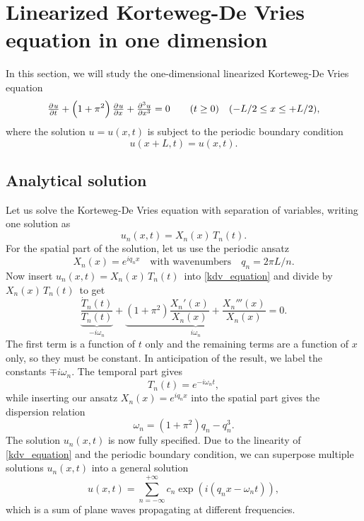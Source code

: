 \section{Linearized Korteweg-De Vries equation in one dimension}

In this section, we will study the one-dimensional linearized Korteweg-De Vries equation
\begin{equation}
\pd{u}{t} + \left(1+\pi^2\right)\pd{u}{x} + \pd[3]{u}{x} = 0 \qquad (t \geq 0) \quad (-L/2 \leq x \leq +L/2),
\label{kdv_equation}
\end{equation}
where the solution $u = u(x,t)$ is subject to the periodic boundary condition
\begin{equation*}
u(x+L, t) = u(x, t).
\end{equation*}

\subsection{Analytical solution}

Let us solve the Korteweg-De Vries equation with separation of variables, writing one solution as
\begin{equation*}
	u_n(x,t) = X_n(x) \, T_n(t).
\end{equation*}
For the spatial part of the solution, let us use the periodic ansatz
\begin{equation*}
	X_n(x) = e^{i q_n x} \quad \text{with wavenumbers} \quad q_n = 2 \pi L / n.
\end{equation*}
Now insert $u_n(x,t) = X_n(x) \, T_n(t)$ into \cref{kdv_equation} and divide by $X_n(x) \, T_n(t)$ to get
\begin{equation*}
	\underbrace{\frac{\dot{T}_n(t)}{T_n(t)}}_{-i \omega_n} + \underbrace{\left( 1 + \pi^2 \right) \frac{X_n'(x)}{X_n(x)} + \frac{X_n'''(x)}{X_n(x)}}_{i \omega_n} = 0.
\end{equation*}
The first term is a function of $t$ only and the remaining terms are a function of $x$ only, so they must be constant.
In anticipation of the result, we label the constants $\mp i \omega_n$.
The temporal part gives
\begin{equation*}
	T_n(t) = e^{-i \omega_n t},
\end{equation*}
while inserting our ansatz $X_n(x) = e^{i q_n x}$ into the spatial part gives the dispersion relation
\begin{equation*}
	\omega_n = (1 + \pi^2) q_n - q_n^3.
\end{equation*}
The solution $u_n(x,t)$ is now fully specified.
Due to the linearity of \cref{kdv_equation} and the periodic boundary condition, we can superpose multiple solutions $u_n(x,t)$ into a general solution
\begin{equation}
	u(x,t) = \sum_{n=-\infty}^{+\infty} c_n \exp{\left( i(q_n x - \omega_n t) \right)},
	\label{fourier_series}
\end{equation}
which is a sum of plane waves propagating at different frequencies.

